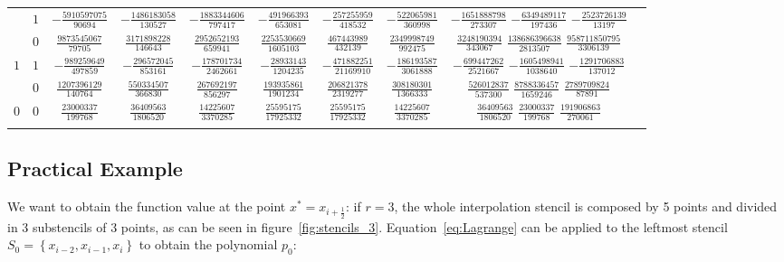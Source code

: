 \begin{table}
\begin{center}
\begin{tabular}{cccccccccc}
           &  $1$  &  $-\frac{  5910597075}{  90694}$  &  $-\frac{  1486183058}{ 130527}$  &  $-\frac{ 1883344606}{  797417}$  &  $-\frac{ 491966393}{  653081}$  &  $-\frac{ 257255959}{  418532}$  &  $-\frac{ 522065981}{  360998}$  &  $-\frac{ 1651888798}{  273307}$  $-\frac{  6349489117}{ 197436}$  $-\frac{  2523726139}{  13197}$  \\ \addlinespace
           &  $0$  &  $ \frac{  9873545067}{  79705}$  &  $ \frac{  3171898228}{ 146643}$  &  $ \frac{ 2952652193}{  659941}$  &  $ \frac{2253530669}{ 1605103}$  &  $ \frac{ 467443989}{  432139}$  &  $ \frac{2349998749}{  992475}$  &  $ \frac{ 3248190394}{  343067}$  $ \frac{138686396638}{2813507}$  $ \frac{958711850795}{3306139}$  \\ \addlinespace
      $1$  &  $1$  &  $-\frac{   989259649}{ 497859}$  &  $-\frac{   296572045}{ 853161}$  &  $-\frac{  178701734}{ 2462661}$  &  $-\frac{  28933143}{ 1204235}$  &  $-\frac{ 471882251}{21169910}$  &  $-\frac{ 186193587}{ 3061888}$  &  $-\frac{  699447262}{ 2521667}$  $-\frac{  1605498941}{1038640}$  $-\frac{  1291706883}{ 137012}$  \\ \addlinespace
           &  $0$  &  $ \frac{  1207396129}{ 140764}$  &  $ \frac{   550334507}{ 366830}$  &  $ \frac{  267692197}{  856297}$  &  $ \frac{ 193935861}{ 1901234}$  &  $ \frac{ 206821378}{ 2319277}$  &  $ \frac{ 308180301}{ 1366333}$  &  $ \frac{  526012837}{  537300}$  $ \frac{  8788336457}{1659246}$  $ \frac{  2789709824}{  87891}$  \\ \addlinespace
      $0$  &  $0$  &  $ \frac{    23000337}{ 199768}$  &  $ \frac{    36409563}{1806520}$  &  $ \frac{   14225607}{ 3370285}$  &  $ \frac{  25595175}{17925332}$  &  $ \frac{  25595175}{17925332}$  &  $ \frac{  14225607}{ 3370285}$  &  $ \frac{   36409563}{ 1806520}$  $ \frac{    23000337}{ 199768}$  $ \frac{   191906863}{ 270061}$  \\ \addlinespace
      \bottomrule
    \end{tabular}
  \end{center}
\end{table}

\subsection{Practical Example}

We want to obtain the function value at the point $x^*=x_{i+\frac{1}{2}}$: if $r=3$, the whole interpolation stencil is composed by \num{5} points and divided in \num{3} substencils of \num{3} points, as can be seen in figure~\ref{fig:stencils_3}. Equation~\eqref{eq:Lagrange} can be applied to the leftmost stencil $S_0=\left\{ x_{i-2}, x_{i-1}, x_i \right\}$ to obtain the polynomial $p_0$:

